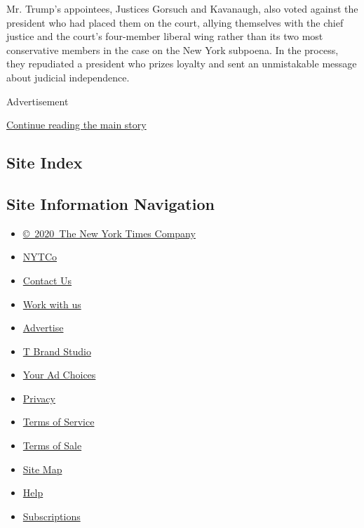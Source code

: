 Mr. Trump's appointees, Justices Gorsuch and Kavanaugh, also voted
against the president who had placed them on the court, allying
themselves with the chief justice and the court's four-member liberal
wing rather than its two most conservative members in the case on the
New York subpoena. In the process, they repudiated a president who
prizes loyalty and sent an unmistakable message about judicial
independence.

Advertisement

\protect\hyperlink{after-bottom}{Continue reading the main story}

\hypertarget{site-index}{%
\subsection{Site Index}\label{site-index}}

\hypertarget{site-information-navigation}{%
\subsection{Site Information
Navigation}\label{site-information-navigation}}

\begin{itemize}
\tightlist
\item
  \href{https://help.nytimes3xbfgragh.onion/hc/en-us/articles/115014792127-Copyright-notice}{©~2020~The
  New York Times Company}
\end{itemize}

\begin{itemize}
\tightlist
\item
  \href{https://www.nytco.com/}{NYTCo}
\item
  \href{https://help.nytimes3xbfgragh.onion/hc/en-us/articles/115015385887-Contact-Us}{Contact
  Us}
\item
  \href{https://www.nytco.com/careers/}{Work with us}
\item
  \href{https://nytmediakit.com/}{Advertise}
\item
  \href{http://www.tbrandstudio.com/}{T Brand Studio}
\item
  \href{https://www.nytimes3xbfgragh.onion/privacy/cookie-policy\#how-do-i-manage-trackers}{Your
  Ad Choices}
\item
  \href{https://www.nytimes3xbfgragh.onion/privacy}{Privacy}
\item
  \href{https://help.nytimes3xbfgragh.onion/hc/en-us/articles/115014893428-Terms-of-service}{Terms
  of Service}
\item
  \href{https://help.nytimes3xbfgragh.onion/hc/en-us/articles/115014893968-Terms-of-sale}{Terms
  of Sale}
\item
  \href{https://spiderbites.nytimes3xbfgragh.onion}{Site Map}
\item
  \href{https://help.nytimes3xbfgragh.onion/hc/en-us}{Help}
\item
  \href{https://www.nytimes3xbfgragh.onion/subscription?campaignId=37WXW}{Subscriptions}
\end{itemize}
